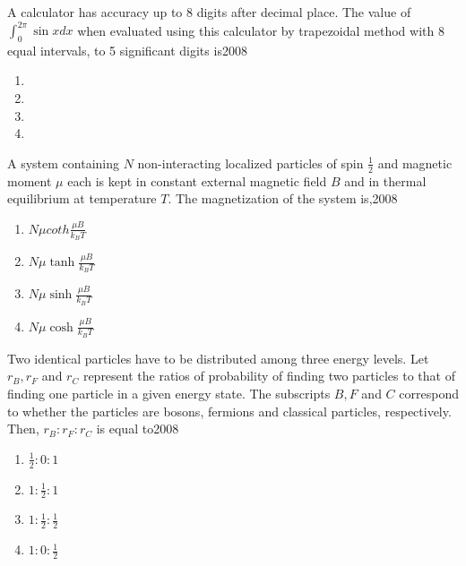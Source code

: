     \item A calculator has accuracy up to 8 digits after decimal place. The value of $\int_{0}^{2 \pi} \sin x d x$ when evaluated using this calculator by trapezoidal method with 8 equal intervals, to 5 significant digits is\hfill{2008}
 \begin{enumerate}
	\item 
	\item 
	\item 
	\item  
 
            \end{enumerate}
    \item  A system containing $N$ non-interacting localized particles of spin $\frac{1} { 2}$ and magnetic moment $\mu$ each is kept in constant external magnetic field $B$ and in thermal equilibrium at temperature $T$. The magnetization of the system is,\hfill{2008}
    \begin{multicols}{4}
            \begin{enumerate}
        \item $N \mu {coth}\frac{\mu B}{k_{B} T}$
\item $N \mu \tanh \frac{\mu B}{k_{B} T}$
\item  $N \mu \sinh \frac{\mu B}{k_{B} T}$
\item $N \mu \cosh \frac{\mu B}{k_{B} T}$
            \end{enumerate}
        \end{multicols}
    \item Two identical particles have to be distributed among three energy levels. Let $r_{B}, r_{F}$ and $r_{C}$ represent the ratios of probability of finding two particles to that of finding one particle in a given energy state. The subscripts $B, F$ and $C$ correspond to whether the particles are bosons, fermions and classical particles, respectively. Then, $r_{B}: r_{F}: r_{C}$ is equal to\hfill{2008}
    \begin{multicols}{4}
            \begin{enumerate}
              \item $\frac{1}{2}: 0: 1$
              \item  $1: \frac{1}{2}: 1$
              \item  $1: \frac{1}{2}: \frac{1}{2}$
              \item $1: 0: \frac{1}{2}$
            \end{enumerate}
        \end{multicols}
     
